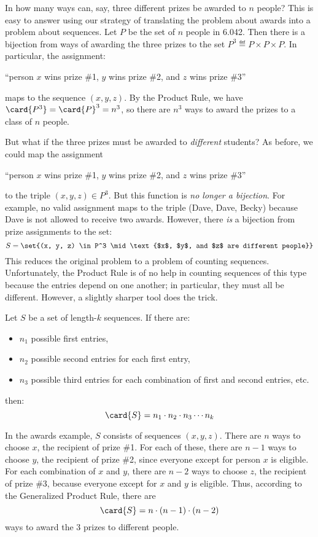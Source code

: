 In how many ways can, say, three different prizes be awarded to $n$
people?  This is easy to answer using our strategy of translating the
problem about awards into a problem about sequences.  Let $P$ be the set
of $n$ people in 6.042.  Then there is a bijection from ways of awarding
the three prizes to the set $P^3 \eqdef P \times P \times P$.  In
particular, the assignment:
%
\begin{center}
``person $x$ wins prize \#1, $y$ wins prize \#2, and $z$ wins prize \#3''
\end{center}
%
maps to the sequence $(x, y, z)$.  By the Product Rule, we have
$\card{P^3}= \card{P}^3 = n^3$, so there are $n^3$ ways to award the
prizes to a class of $n$ people.

But what if the three prizes must be awarded to \emph{different}
students?  As before, we could map the assignment
%
\begin{center}
``person $x$ wins prize \#1, $y$ wins prize \#2, and $z$ wins prize \#3''
\end{center}
%
to the triple $(x, y, z) \in P^3$.  But this function is \emph{no longer
a bijection}.  For example, no valid assignment maps to the triple (Dave,
Dave, Becky) because Dave is not allowed to receive two awards.  However,
there \emph{is} a bijection from prize assignments to the set:
%
\[
S = \set{(x, y, z) \in P^3 \mid \text{$x$, $y$, and $z$ are different people}}
\]
%
This reduces the original problem to a problem of counting sequences.
Unfortunately, the Product Rule is of no help in counting sequences of
this type because the entries depend on one another; in particular,
they must all be different.  However, a slightly sharper tool does the
trick.

\begin{mathrule}
Let $S$ be a set of length-$k$ sequences.  If there are:
%
\begin{itemize}
\item $n_1$ possible first entries,
\item $n_2$ possible second entries for each first entry,
\item $n_3$ possible third entries for each combination of first and
second entries, etc.
\end{itemize}
%
then:
%
\[
\card{S} = n_1 \cdot n_2 \cdot n_3 \cdots n_k
\]
\end{mathrule}

In the awards example, $S$ consists of sequences $(x, y, z)$.  There
are $n$ ways to choose $x$, the recipient of prize \#1.  For each of
these, there are $n-1$ ways to choose $y$, the recipient of prize \#2,
since everyone except for person $x$ is eligible.  For each
combination of $x$ and $y$, there are $n-2$ ways to choose $z$, the
recipient of prize \#3, because everyone except for $x$ and $y$ is
eligible.  Thus, according to the Generalized Product Rule, there are
%
\[
\card{S} = n \cdot (n-1) \cdot (n-2)
\]
%
ways to award the 3 prizes to different people.

